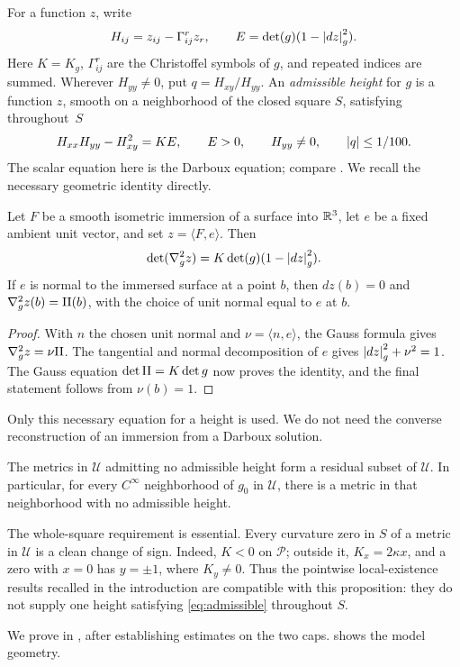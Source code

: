 For a function \(z\), write
\begin{equation}\label{eq:height-notation}
H_{ij}=z_{ij}-\Gamma^r_{ij}z_r,\qquad
E=\det(g)(1-\left\lvert dz\right\rvert_g^2).
\end{equation}
Here \(K=K_g\), \(\Gamma^r_{ij}\) are the Christoffel symbols of
\(g\), and repeated indices are summed. Wherever \(H_{yy}\ne0\),
put \(q=H_{xy}/H_{yy}\). An \emph{admissible height}
for \(g\) is a function \(z\), smooth on a neighborhood of the closed square \(S\), satisfying throughout~\(S\)
\begin{equation}\label{eq:admissible}
H_{xx}H_{yy}-H_{xy}^2=KE,\qquad
E>0,\qquad H_{yy}\ne0,\qquad \left\lvert q\right\rvert\le1/100.
\end{equation}
The scalar equation here is the Darboux equation; compare
\cite[Equation~(1) and Appendix]{Khuri2009}. We recall the necessary geometric
identity directly.

\begin{lemma}\label{lem:height}
Let \(F\) be a smooth isometric immersion of a surface into \(\mathbb R^3\),
let \(e\) be a fixed ambient unit vector, and set \(z=\langle F,e\rangle\).
Then
\[
\det(\nabla_g^2z)=K\det(g)(1-\left\lvert dz\right\rvert_g^2).
\]
If \(e\) is normal to the immersed surface at a point \(b\), then
\(dz(b)=0\) and \(\nabla_g^2z(b)=\mathrm{II}(b)\), with the choice of unit
normal equal to \(e\) at \(b\).
\end{lemma}

\begin{proof}
With \(n\) the chosen unit normal and \(\nu=\langle n,e\rangle\),
the Gauss formula gives \(\nabla_g^2z=\nu\mathrm{II}\). The tangential and
normal decomposition of \(e\) gives
\(\left\lvert dz\right\rvert_g^2+\nu^2=1\).
The Gauss equation \(\det\mathrm{II}=K\det g\) now proves the identity,
and the final statement follows from \(\nu(b)=1\).
\end{proof}

Only this necessary equation for a height is used. We do not need
the converse reconstruction of an immersion from a Darboux solution.

\begin{proposition}\label{prop:patch}
The metrics in \(\mathcal U\) admitting no admissible height form
a residual subset of \(\mathcal U\). In particular, for every
\(C^\infty\) neighborhood of \(g_0\) in \(\mathcal U\), there is
a metric in that neighborhood with no admissible height.
\end{proposition}

The whole-square requirement is essential. Every curvature zero
in \(S\) of a metric in \(\mathcal U\) is a clean change of sign. Indeed,
\(K<0\) on \(\mathcal P\); outside it,
\(K_x=2\kappa x\), and a zero with \(x=0\) has
\(y=\pm1\), where \(K_y\ne0\). Thus the pointwise local-existence
results recalled in the introduction are compatible with this
proposition: they do not supply one height satisfying
\eqref{eq:admissible} throughout \(S\).

We prove  in , after establishing estimates on
the two caps.  shows the model geometry.



